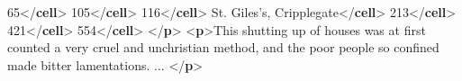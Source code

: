 \documentclass[11pt,twoside]{article}\makeatletter
\begin{document}
\begin{shaded}
\hspace*{6pt}\hspace*{6pt}65{</\textbf{cell}>}\mbox{}\newline 
\hspace*{6pt}\hspace*{6pt}105{</\textbf{cell}>}\mbox{}\newline 
\hspace*{6pt}\hspace*{6pt}116{</\textbf{cell}>}\mbox{}\newline 
\hspace*{6pt}\mbox{}\newline 
\hspace*{6pt}\mbox{}\newline 
\hspace*{6pt}\hspace*{6pt}St. Giles's, Cripplegate{</\textbf{cell}>}\mbox{}\newline 
\hspace*{6pt}\hspace*{6pt}213{</\textbf{cell}>}\mbox{}\newline 
\hspace*{6pt}\hspace*{6pt}421{</\textbf{cell}>}\mbox{}\newline 
\hspace*{6pt}\hspace*{6pt}554{</\textbf{cell}>}\mbox{}\newline 
\hspace*{6pt}\mbox{}\newline 
{}\mbox{}\newline 
{</\textbf{p}>}\mbox{}\newline 
{<\textbf{p}>}This shutting up of houses was at first counted a very cruel\mbox{}\newline 
 and unchristian method, and the poor people so confined made\mbox{}\newline 
 bitter lamentations. ... {</\textbf{p}>}\end{shaded}\egroup\par 
\end{document}
